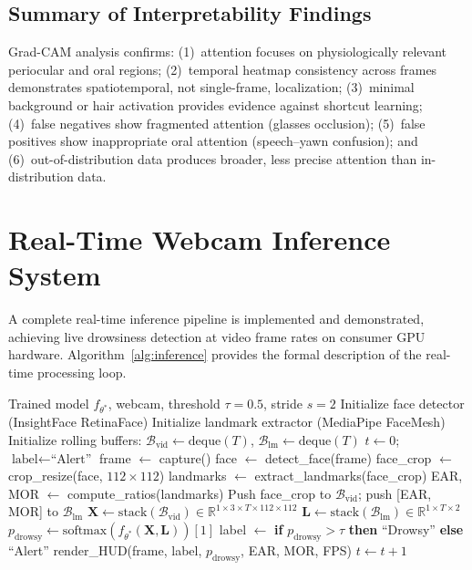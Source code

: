 \documentclass[journal]{IEEEtran}
\begin{document}
\subsection{Summary of Interpretability Findings}
\label{sec:gradcam_summary}
Grad-CAM analysis confirms: (1)~attention focuses on physiologically relevant periocular and oral regions; (2)~temporal heatmap consistency across frames demonstrates spatiotemporal, not single-frame, localization; (3)~minimal background or hair activation provides evidence against shortcut learning; (4)~false negatives show fragmented attention (glasses occlusion); (5)~false positives show inappropriate oral attention (speech--yawn confusion); and (6)~out-of-distribution data produces broader, less precise attention than in-distribution data.

\section{Real-Time Webcam Inference System}
\label{sec:realtime}

A complete real-time inference pipeline is implemented and demonstrated, achieving live drowsiness detection at video frame rates on consumer GPU hardware. Algorithm~\ref{alg:inference} provides the formal description of the real-time processing loop.

\begin{algorithm}[t]
\caption{Real-Time Drowsiness Detection Pipeline}
\label{alg:inference}
\begin{algorithmic}[1]
\REQUIRE Trained model $f_{\theta^*}$, webcam, threshold $\tau{=}0.5$, stride $s{=}2$
\STATE Initialize face detector (InsightFace RetinaFace)
\STATE Initialize landmark extractor (MediaPipe FaceMesh)
\STATE Initialize rolling buffers: $\mathcal{B}_{\text{vid}} \leftarrow \text{deque}(T)$, $\mathcal{B}_{\text{lm}} \leftarrow \text{deque}(T)$
\STATE $t \leftarrow 0$; $\text{label} \leftarrow \text{``Alert''}$
  \STATE frame $\leftarrow$ capture()
  \STATE face $\leftarrow$ detect\_face(frame)
  \STATE face\_crop $\leftarrow$ crop\_resize(face, $112{\times}112$)
  \STATE landmarks $\leftarrow$ extract\_landmarks(face\_crop)
  \STATE EAR, MOR $\leftarrow$ compute\_ratios(landmarks)
  \STATE Push face\_crop to $\mathcal{B}_{\text{vid}}$; push [EAR, MOR] to $\mathcal{B}_{\text{lm}}$
    \STATE $\mathbf{X} \leftarrow \text{stack}(\mathcal{B}_{\text{vid}}) \in \mathbb{R}^{1 \times 3 \times T \times 112 \times 112}$
    \STATE $\mathbf{L} \leftarrow \text{stack}(\mathcal{B}_{\text{lm}}) \in \mathbb{R}^{1 \times T \times 2}$
    \STATE $p_{\text{drowsy}} \leftarrow \text{softmax}(f_{\theta^*}(\mathbf{X}, \mathbf{L}))[1]$
    \STATE label $\leftarrow$ \textbf{if} $p_{\text{drowsy}} > \tau$ \textbf{then} ``Drowsy'' \textbf{else} ``Alert''
  \ENDIF
  \STATE render\_HUD(frame, label, $p_{\text{drowsy}}$, EAR, MOR, FPS)
  \STATE $t \leftarrow t + 1$
\ENDWHILE
\end{algorithmic}
\end{algorithm}
\end{document}
